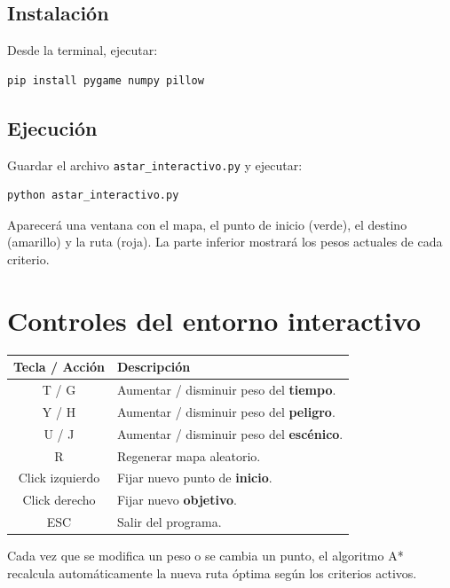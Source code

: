 \documentclass[12pt,a4paper]{article}
\begin{document}
\subsection{Instalación}
Desde la terminal, ejecutar:
\begin{verbatim}
pip install pygame numpy pillow
\end{verbatim}

\subsection{Ejecución}
Guardar el archivo \texttt{astar\_interactivo.py} y ejecutar:
\begin{verbatim}
python astar_interactivo.py
\end{verbatim}

Aparecerá una ventana con el mapa, el punto de inicio (verde), el destino (amarillo) y la ruta (roja).  
La parte inferior mostrará los pesos actuales de cada criterio.

\section{Controles del entorno interactivo}

\begin{center}
\begin{tabular}{|c|l|}
\hline
\textbf{Tecla / Acción} & \textbf{Descripción} \\
\hline
T / G & Aumentar / disminuir peso del \textbf{tiempo}. \\
Y / H & Aumentar / disminuir peso del \textbf{peligro}. \\
U / J & Aumentar / disminuir peso del \textbf{escénico}. \\
R & Regenerar mapa aleatorio. \\
Click izquierdo & Fijar nuevo punto de \textbf{inicio}. \\
Click derecho & Fijar nuevo \textbf{objetivo}. \\
ESC & Salir del programa. \\
\hline
\end{tabular}
\end{center}

Cada vez que se modifica un peso o se cambia un punto, el algoritmo A* recalcula automáticamente la nueva ruta óptima según los criterios activos.

\end{document}
